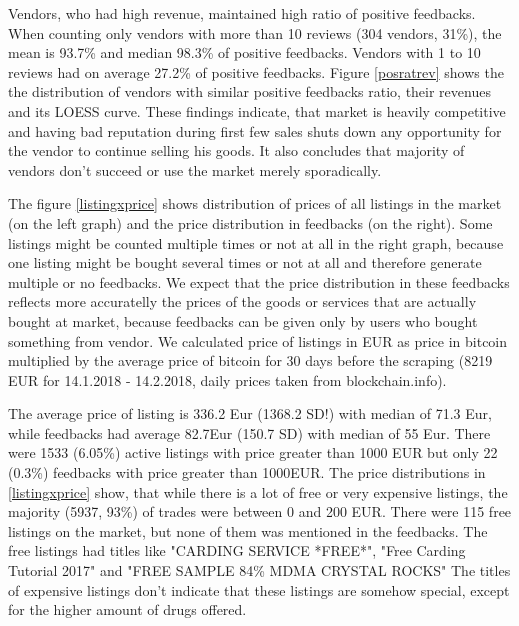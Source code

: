 \documentclass[
  digital, %
  table,   %
  lof,     %
  lot,     %
  oneside
]{fithesis3}
\begin{document}
Vendors, who had high revenue, maintained high ratio of positive feedbacks.
When counting only vendors with more than 10 reviews (304 vendors, 31\%),
the mean is 93.7\% and median 98.3\% of positive feedbacks.
Vendors with 1 to 10 reviews had on average 27.2\% of positive feedbacks.
Figure \ref{posratrev} shows the the distribution of vendors with similar
positive feedbacks ratio, their revenues and its LOESS curve.
These findings indicate, that market is heavily competitive and
having bad reputation during first few sales shuts down any opportunity
for the vendor to continue selling his goods. It also concludes that majority of vendors don't succeed or use
the market merely sporadically.

The figure \ref{listingxprice} shows distribution of prices of all listings in
 the market (on the left graph) and the price distribution in feedbacks (on the right).
 Some listings might be counted multiple times or not at all
 in the right graph, because one listing might be bought several times or not at all
 and therefore generate multiple or no feedbacks. We expect that the price distribution
 in these feedbacks reflects more accuratelly the prices of the goods or services
 that are actually bought at market, because feedbacks can be given only by users who
 bought something from vendor. We calculated price of listings in EUR as 
 price in bitcoin multiplied by the average price of bitcoin for 30 days before the scraping
 (8219 EUR for 14.1.2018 - 14.2.2018, daily prices taken from blockchain.info).
 
 The average price of listing is 336.2 Eur (1368.2 SD!) with median of 71.3 Eur,
 while feedbacks had average 82.7Eur (150.7 SD) with median of 55 Eur.
  There were 1533 (6.05\%) active listings with price greater than 1000 EUR but 
  only 22 (0.3\%) feedbacks with price greater than 1000EUR.
 The price distributions in \ref{listingxprice} show,
 that while there is a lot of free or very expensive listings,
 the majority (5937, 93\%) of trades were between 0 and 200 EUR.
 There were 115 free listings on the market,
 but none of them was mentioned in the feedbacks.
 The free listings had titles like "CARDING SERVICE *FREE*",
  "Free Carding Tutorial 2017" and "FREE SAMPLE 84\% MDMA CRYSTAL ROCKS"
 The titles of expensive listings don't indicate that 
these listings are somehow special, except for the higher amount of drugs offered.
\end{document}
